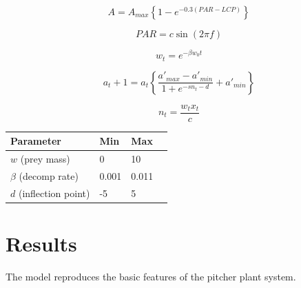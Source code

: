 \documentclass[a0,landscape]{a0poster}
\begin{document}
\begin{multicols}{4}
\begin{equation}
  A = A_{max} \left\{ 1 - e^{-0.3 (PAR - LCP)} \right\} 
  \label{eqn:photosynthesis}
\end{equation}

\begin{equation}
PAR = c \sin(2 \pi f)
\label{eqn:PAR}
\end{equation}

\begin{equation}
w_t = e^{-\beta w_0 t}
\label{eqn:decomp}
\end{equation}

\begin{equation}
a_t+1 = a_t \left\{ \frac{a'_{max}-a'_{min}}{1+e^{-s n_t - d}} + a'_{min}\right\}
\label{eqn:oxygenation}
\end{equation}

\begin{equation}
n_t = \frac{w_t x_t}{c}
\label{eqn:nutrients}
\end{equation}



\begin{center}\vspace{1cm}
\begin{tabular}{l l l l}
\toprule
\textbf{Parameter} & \textbf{Min} & \textbf{Max} \\
\midrule
$w$ (prey mass) & 0 & 10 \\
$\beta$ (decomp rate) & 0.001 & 0.011 \\
$d$ (inflection point) & -5 & 5 \\
\bottomrule
\end{tabular}
\end{center}\vspace{1cm}






\section*{Results}


\begin{block}{The model reproduces the basic features of the pitcher plant system.}


\end{block}
\end{multicols}
\end{document}
